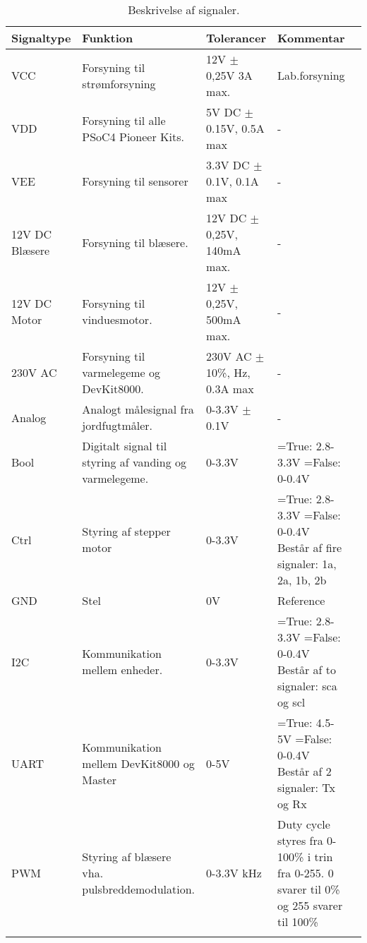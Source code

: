 \begin{longtable}{| l | >{\raggedright}X | >{\raggedright}X | >{\raggedright\arraybackslash}X |>{\raggedright}X |}
\hline
	\textbf{Signaltype} & \textbf{Funktion} & \textbf{Tolerancer} & \textbf{Kommentar}\\ \hline
	VCC & Forsyning til strømforsyning & 12V $\pm$ 0,25V \newline 3A max. & Lab.forsyning  \\\hline	
	VDD & Forsyning til alle PSoC4 Pioneer Kits. & 5V DC $\pm$ 0.15V, \newline 0.5A max & - \\\hline
	VEE & Forsyning til sensorer & 3.3V DC $\pm$ 0.1V, \newline 0.1A max & - \\\hline
	12V DC Blæsere & Forsyning til blæsere. & 12V DC $\pm$ 0,25V, \newline 140mA max. & - \\\hline	
	12V DC Motor & Forsyning til vinduesmotor. & 12V $\pm$ 0,25V, \newline 500mA max. & - \\\hline
	230V AC & Forsyning til varmelegeme og DevKit8000. & 230V AC $\pm$ 10\%, \newline 50 Hz, \newline 0.3A max & - \\\hline
	Analog & Analogt målesignal fra jordfugtmåler. & 0-3.3V $\pm$ 0.1V & - \\\hline	
	Bool & Digitalt signal til styring af vanding og varmelegeme. & 0-3.3V & 1=True: 2.8-3.3V \newline 0=False: 0-0.4V \\\hline	
	Ctrl & Styring af stepper motor & 0-3.3V & 1=True: 2.8-3.3V \newline 0=False: 0-0.4V  \newline Består af fire signaler: \newline 1a, 2a, 1b, 2b \\\hline	
	GND & Stel & 0V & Reference \\\hline	
	I2C & Kommunikation mellem \IIC enheder. & 0-3.3V & 1=True: 2.8-3.3V \newline 0=False: 0-0.4V \newline Består af to signaler: \newline sca og scl \\\hline	
	UART & Kommunikation mellem DevKit8000 og Master & 0-5V & 1=True: 4.5-5V \newline 0=False: 0-0.4V \newline Består af 2 signaler: \newline Tx og Rx \\\hline	
	PWM & Styring af blæsere vha. pulsbreddemodulation. & 0-3.3V \newline 1 kHz & Duty cycle styres fra 0-100\% i trin fra 0-255. 0 svarer til 0\% og 255 svarer til 100\% \\\hline
\caption{Beskrivelse af signaler.}
\label{tbl:signalbeskriv}
\end{longtable}